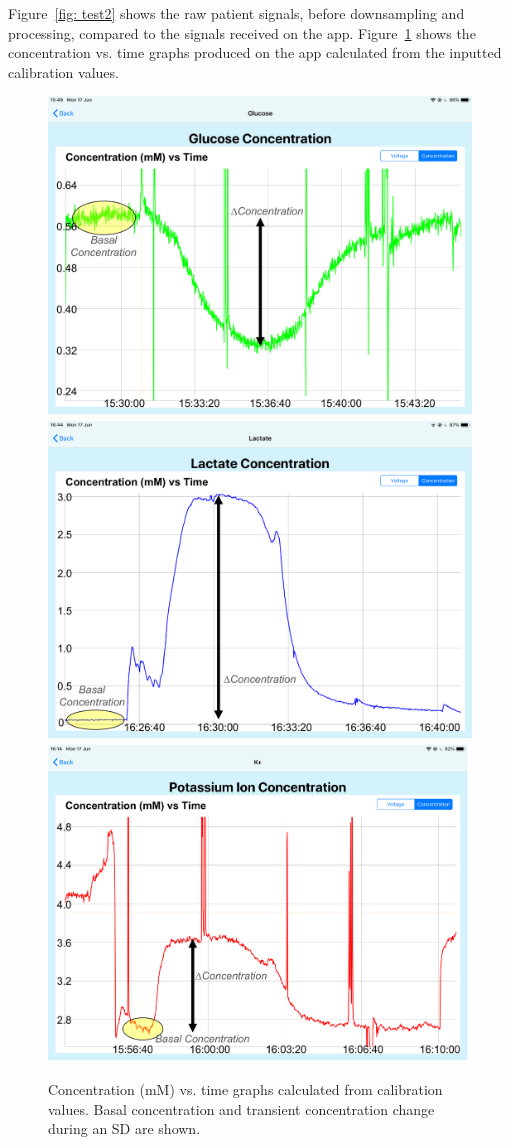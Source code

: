 Figure~\ref{fig: test2} shows the raw patient signals, before downsampling and processing, compared to the signals received on the app. Figure~\ref{fig: test2 conc} shows the concentration vs. time graphs produced on the app calculated from the inputted calibration values.

\begin{figure}[p]
\centering
\includegraphics[trim={0cm 0cm 0cm  0cm}, clip, width=.6\textwidth]{./figures/patientsignals/Gconc.pdf}
\bigbreak
\includegraphics[trim={0cm 0cm 0cm  0cm}, clip, width=.6\textwidth]{./figures/patientsignals/Lconc.pdf}
\bigbreak
\includegraphics[trim={0cm 0cm 0cm  0cm}, clip, width=.6\textwidth]{./figures/patientsignals/Kconc.pdf}
\captionsetup{justification=centering}
\caption{Concentration (mM) vs. time graphs calculated from calibration values. Basal concentration and transient concentration change during an SD are shown.}
\label{fig: test2 conc}
\end{figure}